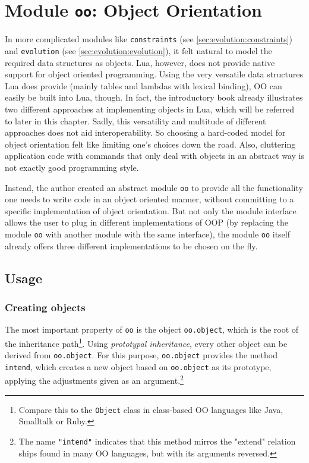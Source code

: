 \chapter{Module \texttt{oo}: Object Orientation}
\label{oo}
\label{chap:oo}

In more complicated modules like \texttt{constraints} (see \ref{sec:evolution:constraints}) and \texttt{evolution} (see \ref{sec:evolution:evolution}), it felt natural to model the required data structures as objects. Lua, however, does not provide native support for object oriented programming. Using the very versatile data structures Lua does provide (mainly tables and lambdas with lexical binding), OO can easily be built into Lua, though. In fact, the introductory book \cite{Ierusalimschy2006} already illustrates two different approaches at implementing objects in Lua, which will be referred to later in this chapter. Sadly, this versatility and multitude of different approaches does not aid interoperability. So choosing a hard-coded model for object orientation felt like limiting one's choices down the road. Also, cluttering application code with commands that only deal with objects in an abstract way is not exactly good programming style.

Instead, the author created an abstract module \texttt{oo} to provide all the functionality one needs to write code in an object oriented manner, without committing to a specific implementation of object orientation. But not only the module interface allows the user to plug in different implementations of OOP (by replacing the module \texttt{oo} with another module with the same interface), the module \texttt{oo} itself already offers three different implementations to be chosen on the fly.

\section{Usage}

\subsection{Creating objects}

The most important property of \texttt{oo} is the object \texttt{oo.object}, which is the root of the inheritance path\footnote{Compare this to the \texttt{Object} class in class-based OO languages like Java, Smalltalk or Ruby.}. Using \emph{prototypal inheritance}, every other object can be derived from \texttt{oo.object}. For this purpose, \texttt{oo.object} provides the method \texttt{intend}, which creates a new object based on \texttt{oo.object} as its prototype, applying the adjustments given as an argument.\footnote{The name \texttt{"intend"} indicates that this method mirros the "extend" relation ships found in many OO languages, but with its arguments reversed.}

